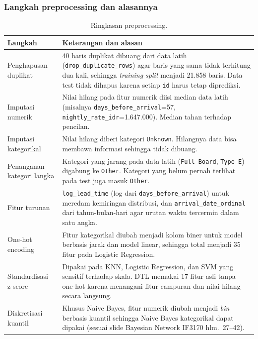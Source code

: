 \documentclass[12pt,a4paper]{article}
\begin{document}
\subsubsection{Langkah preprocessing dan alasannya}
\begin{table}[H]\centering\small
\begin{tabularx}{\textwidth}{>{\raggedright\arraybackslash}p{3.6cm}X}
\toprule
Langkah & Keterangan dan alasan \\
\midrule
Penghapusan duplikat & 40 baris duplikat dibuang dari data latih (\texttt{drop\_duplicate\_rows}) agar baris yang sama tidak terhitung dua kali, sehingga \textit{training split} menjadi 21.858 baris. Data test tidak dihapus karena setiap \texttt{id} harus tetap diprediksi. \\
Imputasi numerik & Nilai hilang pada fitur numerik diisi median data latih (misalnya \texttt{days\_before\_arrival}=57, \texttt{nightly\_rate\_idr}=1.647.000). Median tahan terhadap pencilan. \\
Imputasi kategorikal & Nilai hilang diberi kategori \texttt{Unknown}. Hilangnya data bisa membawa informasi sehingga tidak dibuang. \\
Penanganan kategori langka & Kategori yang jarang pada data latih (\texttt{Full Board}, \texttt{Type E}) digabung ke \texttt{Other}. Kategori yang belum pernah terlihat pada test juga masuk \texttt{Other}. \\
Fitur turunan & \texttt{log\_lead\_time} (log dari \texttt{days\_before\_arrival}) untuk meredam kemiringan distribusi, dan \texttt{arrival\_date\_ordinal} dari tahun-bulan-hari agar urutan waktu tercermin dalam satu angka. \\
One-hot encoding & Fitur kategorikal diubah menjadi kolom biner untuk model berbasis jarak dan model linear, sehingga total menjadi 35 fitur pada Logistic Regression. \\
Standardisasi z-score & Dipakai pada KNN, Logistic Regression, dan SVM yang sensitif terhadap skala. DTL memakai 17 fitur asli tanpa one-hot karena menangani fitur campuran dan nilai hilang secara langsung. \\
Diskretisasi kuantil & Khusus Naive Bayes, fitur numerik diubah menjadi \textit{bin} berbasis kuantil sehingga Naive Bayes kategorikal dapat dipakai (sesuai slide Bayesian Network IF3170 hlm.~27--42). \\
\bottomrule
\end{tabularx}
\caption{Ringkasan preprocessing.}
\end{table}
\end{document}
